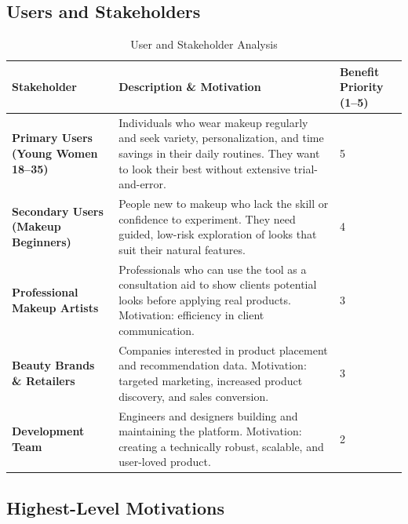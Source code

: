 \documentclass[11pt, letterpaper]{article}
\begin{document}
\subsection{Users and Stakeholders}

\begin{table}[H]
\centering
\caption{User and Stakeholder Analysis}
\begin{tabularx}{\textwidth}{>{\bfseries}p{3cm} X p{2cm}}
\toprule
\textbf{Stakeholder} & \textbf{Description \& Motivation} & \textbf{Benefit Priority (1--5)} \\
\midrule
Primary Users (Young Women 18--35) & Individuals who wear makeup regularly and seek variety, personalization, and time savings in their daily routines. They want to look their best without extensive trial-and-error. & 5 \\
\addlinespace
Secondary Users (Makeup Beginners) & People new to makeup who lack the skill or confidence to experiment. They need guided, low-risk exploration of looks that suit their natural features. & 4 \\
\addlinespace
Professional Makeup Artists & Professionals who can use the tool as a consultation aid to show clients potential looks before applying real products. Motivation: efficiency in client communication. & 3 \\
\addlinespace
Beauty Brands \& Retailers & Companies interested in product placement and recommendation data. Motivation: targeted marketing, increased product discovery, and sales conversion. & 3 \\
\addlinespace
Development Team & Engineers and designers building and maintaining the platform. Motivation: creating a technically robust, scalable, and user-loved product. & 2 \\
\bottomrule
\end{tabularx}
\end{table}

\subsection{Highest-Level Motivations}
\end{document}
